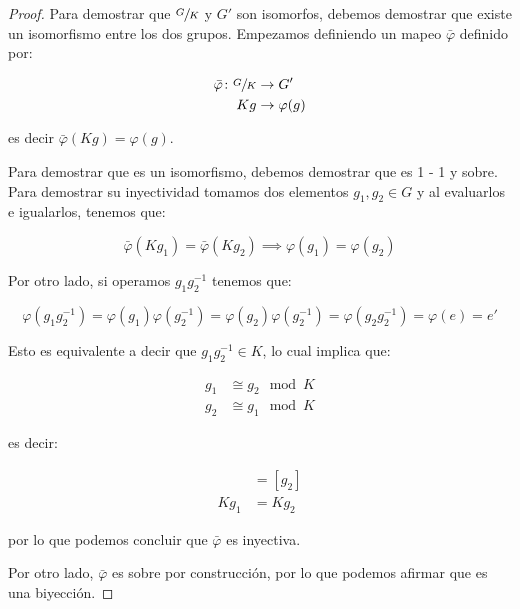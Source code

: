         \begin{proof}
            Para demostrar que $\sfrac{G}{K}$ y $G'$ son isomorfos, debemos demostrar que existe un isomorfismo entre los dos grupos. Empezamos definiendo un mapeo $\bar{\varphi}$ definido por:

            \begin{align*}
                \bar{\varphi} \colon \sfrac{G}{K} &\to G' \\
                Kg &\to \varphi(g)
            \end{align*}

            es decir $\bar{\varphi}(Kg) = \varphi(g)$.

            Para demostrar que es un isomorfismo, debemos demostrar que es 1 - 1 y sobre.
            Para demostrar su inyectividad tomamos dos elementos $g_1, g_2 \in G$ y al evaluarlos e igualarlos, tenemos que:

            \begin{equation*}
                \bar{\varphi}(Kg_1) = \bar{\varphi}(Kg_2) \implies \varphi(g_1) = \varphi(g_2)
            \end{equation*}

            Por otro lado, si operamos $g_1 g_2^{-1}$ tenemos que:

            \begin{equation*}
                \varphi(g_1 g_2^{-1}) = \varphi(g_1) \varphi(g_2^{-1}) = \varphi(g_2) \varphi(g_2^{-1}) = \varphi(g_2 g_2^{-1}) = \varphi(e) = e'
            \end{equation*}

            Esto es equivalente a decir que $g_1 g_2^{-1} \in K$, lo cual implica que:

            \begin{align*}
                g_1 &\cong g_2 \mod K \\
                g_2 &\cong g_1 \mod K
            \end{align*}

            es decir:

            \begin{align*}
                [g_1] &= [g_2] \\
                Kg_1 &= Kg_2
            \end{align*}

            por lo que podemos concluir que $\bar{\varphi}$ es inyectiva.

            Por otro lado, $\bar{\varphi}$ es sobre por construcción, por lo que podemos afirmar que es una biyección.
        \end{proof}

